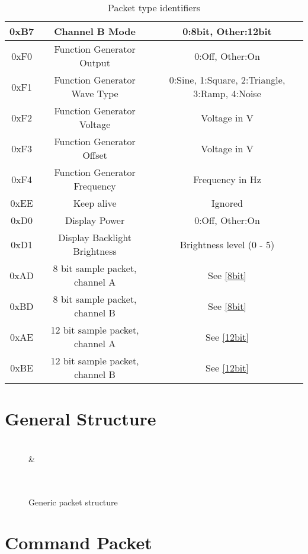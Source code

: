 \documentclass[]{article}
\begin{document}
\begin{table}[H]
\begin{tabular}{|c|c|c|}
		0xB7 & Channel B Mode & 0:8bit, Other:12bit \\ \hline
		0xF0 & Function Generator Output & 0:Off, Other:On \\ \hline
		0xF1 & Function Generator Wave Type & 0:Sine, 1:Square, 2:Triangle, 3:Ramp, 4:Noise \\ \hline
		0xF2 & Function Generator Voltage & Voltage in \textmu V \\ \hline
		0xF3 & Function Generator Offset & Voltage in \textmu V \\ \hline
		0xF4 & Function Generator Frequency & Frequency in Hz \\ \hline
		0xEE & Keep alive & Ignored \\ \hline
		0xD0 & Display Power & 0:Off, Other:On \\ \hline
		0xD1 & Display Backlight Brightness & Brightness level (0 - 5) \\ \hline
		0xAD & 8 bit sample packet, channel A & See \autoref{8bit} \\ \hline
		0xBD & 8 bit sample packet, channel B & See \autoref{8bit} \\ \hline
		0xAE & 12 bit sample packet, channel A & See \autoref{12bit} \\ \hline
		0xBE & 12 bit sample packet, channel B & See \autoref{12bit} \\ \hline
	\end{tabular}
	\caption{Packet type identifiers}
\end{table}

\section{General Structure}
\begin{figure}[H]
	\centering
	\begin{bytefield}[bitwidth=2em]{16}
		 \\
		 &  \\
		 \\
		 \\
	\end{bytefield}
	\caption{Generic packet structure}
\end{figure}

\section{Command Packet}
\end{document}
